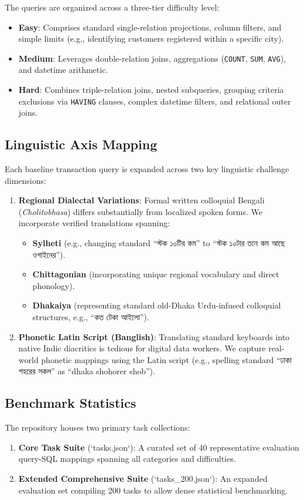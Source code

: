 \documentclass[11pt,a4paper]{article}
\begin{document}
The queries are organized across a three-tier difficulty level:
\begin{itemize}
    \item \textbf{Easy}: Comprises standard single-relation projections, column filters, and simple limits (e.g., identifying customers registered within a specific city).
    \item \textbf{Medium}: Leverages double-relation joins, aggregations (\texttt{COUNT}, \texttt{SUM}, \texttt{AVG}), and datetime arithmetic.
    \item \textbf{Hard}: Combines triple-relation joins, nested subqueries, grouping criteria exclusions via \texttt{HAVING} clauses, complex datetime filters, and relational outer joins.
\end{itemize}

\subsection{Linguistic Axis Mapping}
Each baseline transaction query is expanded across two key linguistic challenge dimensions:
\begin{enumerate}
    \item \textbf{Regional Dialectal Variations}: Formal written colloquial Bengali (\textit{Cholitobhasa}) differs substantially from localized spoken forms. We incorporate verified translations spanning:
    \begin{itemize}
        \item \textbf{Sylheti} (e.g., changing standard ``স্টক ১০টির কম'' to ``স্টক ১০টার তনে কম আছে ওগাইনের'').
        \item \textbf{Chittagonian} (incorporating unique regional vocabulary and direct phonology).
        \item \textbf{Dhakaiya} (representing standard old-Dhaka Urdu-infused colloquial structures, e.g., ``কত টেকা আইলো'').
    \end{itemize}
    \item \textbf{Phonetic Latin Script (Banglish)}: Translating standard keyboards into native Indic diacritics is tedious for digital data workers. We capture real-world phonetic mappings using the Latin script (e.g., spelling standard ``ঢাকা শহরের সকল'' as ``dhaka shohorer shob'').
\end{enumerate}

\subsection{Benchmark Statistics}
The repository houses two primary task collections:
\begin{enumerate}
    \item \textbf{Core Task Suite} (`tasks.json`): A curated set of 40 representative evaluation query-SQL mappings spanning all categories and difficulties.
    \item \textbf{Extended Comprehensive Suite} (`tasks_200.json`): An expanded evaluation set compiling 200 tasks to allow dense statistical benchmarking.
\end{enumerate}
\end{document}
